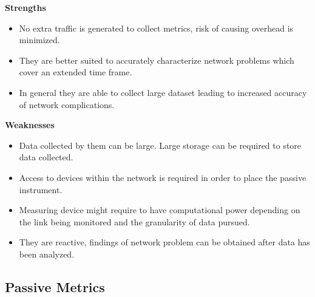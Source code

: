 \textbf{Strengths}
\begin{itemize}
	\item No extra traffic is generated to collect metrics, risk of causing overhead is minimized.
	\item They are better suited to accurately characterize network problems which cover an extended time frame.
	\item In general they are able to collect large dataset leading to increased accuracy of network complications.

\end{itemize}


\textbf{Weaknesses}
\begin{itemize}
	\item Data collected by them can be large. Large storage can be required to store data collected.
	\item Access to devices within the network is required in order to place the passive instrument.
	\item Measuring device might require to have computational power depending on the link being monitored and the granularity of data pursued.
	\item They are reactive, findings of network problem can be obtained after data has been analyzed.
	
\end{itemize}

\subsection*{Passive Metrics}

